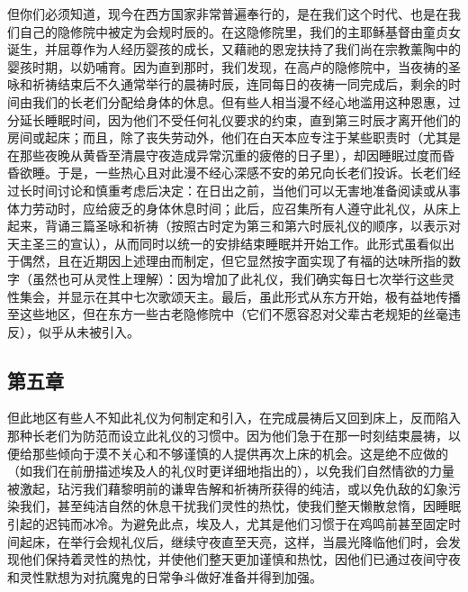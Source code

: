 但你们必须知道，现今在西方国家非常普遍奉行的，是在我们这个时代、也是在我们自己的隐修院中被定为会规时辰的。在这隐修院里，我们的主耶稣基督由童贞女诞生，并屈尊作为人经历婴孩的成长，又藉祂的恩宠扶持了我们尚在宗教薰陶中的婴孩时期，以奶哺育。因为直到那时，我们发现，在高卢的隐修院中，当夜祷的圣咏和祈祷结束后不久通常举行的晨祷时辰，连同每日的夜祷一同完成后，剩余的时间由我们的长老们分配给身体的休息。但有些人相当漫不经心地滥用这种恩惠，过分延长睡眠时间，因为他们不受任何礼仪要求的约束，直到第三时辰才离开他们的房间或起床；而且，除了丧失劳动外，他们在白天本应专注于某些职责时（尤其是在那些夜晚从黄昏至清晨守夜造成异常沉重的疲倦的日子里），却因睡眠过度而昏昏欲睡。于是，一些热心且对此漫不经心深感不安的弟兄向长老们投诉。长老们经过长时间讨论和慎重考虑后决定：在日出之前，当他们可以无害地准备阅读或从事体力劳动时，应给疲乏的身体休息时间；此后，应召集所有人遵守此礼仪，从床上起来，背诵三篇圣咏和祈祷（按照古时定为第三和第六时辰礼仪的顺序，以表示对天主圣三的宣认），从而同时以统一的安排结束睡眠并开始工作。此形式虽看似出于偶然，且在近期因上述理由而制定，但它显然按字面实现了有福的达味所指的数字（虽然也可从灵性上理解）：因为增加了此礼仪，我们确实每日七次举行这些灵性集会，并显示在其中七次歌颂天主。最后，虽此形式从东方开始，极有益地传播至这些地区，但在东方一些古老隐修院中（它们不愿容忍对父辈古老规矩的丝毫违反），似乎从未被引入。\par


\subsection{第五章}

\par

但此地区有些人不知此礼仪为何制定和引入，在完成晨祷后又回到床上，反而陷入那种长老们为防范而设立此礼仪的习惯中。因为他们急于在那一时刻结束晨祷，以便给那些倾向于漠不关心和不够谨慎的人提供再次上床的机会。这是绝不应做的（如我们在前册描述埃及人的礼仪时更详细地指出的），以免我们自然情欲的力量被激起，玷污我们藉黎明前的谦卑告解和祈祷所获得的纯洁，或以免仇敌的幻象污染我们，甚至纯洁自然的休息干扰我们灵性的热忱，使我们整天懒散怠惰，因睡眠引起的迟钝而冰冷。为避免此点，埃及人，尤其是他们习惯于在鸡鸣前甚至固定时间起床，在举行会规礼仪后，继续守夜直至天亮，这样，当晨光降临他们时，会发现他们保持着灵性的热忱，并使他们整天更加谨慎和热忱，因他们已通过夜间守夜和灵性默想为对抗魔鬼的日常争斗做好准备并得到加强。\par

